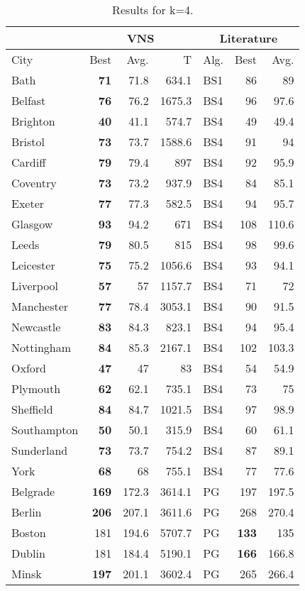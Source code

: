 \documentclass[dvipsnames,format=sigconf,anonymous=true,review=true]{acmart}
\begin{document}
\begin{table}
	\begin{tabular}{l|rrr|lrr}
		\hline
		\multicolumn{1}{c}{ } & \multicolumn{3}{|c}{VNS} & \multicolumn{3}{|c}{Literature} \\
		\hline
		City & Best & Avg. & T & Alg. & Best & Avg. \\ \hline
		Bath&\bf{71}&71.8&634.1&BS1&86&89\\
		Belfast&\bf{76}&76.2&1675.3&BS4&96&97.6\\
		Brighton&\bf{40}&41.1&574.7&BS4&49&49.4\\
		Bristol&\bf{73}&73.7&1588.6&BS4&91&94\\
		Cardiff&\bf{79}&79.4&897&BS4&92&95.9\\
		Coventry&\bf{73}&73.2&937.9&BS4&84&85.1\\
		Exeter&\bf{77}&77.3&582.5&BS4&94&95.7\\
		Glasgow&\bf{93}&94.2&671&BS4&108&110.6\\
		Leeds&\bf{79}&80.5&815&BS4&98&99.6\\
		Leicester&\bf{75}&75.2&1056.6&BS4&93&94.1\\
		Liverpool&\bf{57}&57&1157.7&BS4&71&72\\
		Manchester&\bf{77}&78.4&3053.1&BS4&90&91.5\\
		Newcastle&\bf{83}&84.3&823.1&BS4&94&95.4\\
		Nottingham&\bf{84}&85.3&2167.1&BS4&102&103.3\\
		Oxford&\bf{47}&47&83&BS4&54&54.9\\
		Plymouth&\bf{62}&62.1&735.1&BS4&73&75\\
		Sheffield&\bf{84}&84.7&1021.5&BS4&97&98.9\\
		Southampton&\bf{50}&50.1&315.9&BS4&60&61.1\\
		Sunderland&\bf{73}&73.7&754.2&BS4&87&89.1\\
		York&\bf{68}&68&755.1&BS4&77&77.6\\
		Belgrade&\bf{169}&172.3&3614.1&PG&197&197.5\\
		Berlin&\bf{206}&207.1&3611.6&PG&268&270.4\\
		Boston&181&194.6&5707.7&PG&\bf{133}&135\\
		Dublin&181&184.4&5190.1&PG&\bf{166}&166.8\\
		Minsk&\bf{197}&201.1&3602.4&PG&265&266.4\\
		
		\hline
		
	\end{tabular}
	\caption{Results for k=4.}
	\label{tab:k4}  
\end{table}
\end{document}
